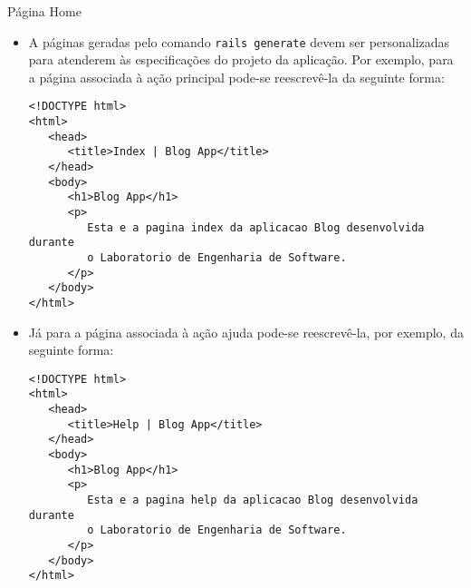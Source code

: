 
\begin{frame}{Página Home}
    \begin{itemize}
      \item  A páginas geradas pelo comando \verb!rails generate! devem ser personalizadas para
	atenderem às especificações do projeto da aplicação. Por exemplo, para a página associada à ação principal
	pode-se reescrevê-la da seguinte forma:
	    \begin{lstlisting}[style=RubyInputStyle, basicstyle=\tiny\ttfamily, caption=app/views/home/index.html.erb]
<!DOCTYPE html>
<html>
   <head>
      <title>Index | Blog App</title>
   </head>
   <body>
      <h1>Blog App</h1>
      <p>
         Esta e a pagina index da aplicacao Blog desenvolvida durante
         o Laboratorio de Engenharia de Software.
      </p>
   </body>
</html>
	    \end{lstlisting}
    
      \item Já para a página associada à ação ajuda pode-se reescrevê-la, por exemplo, da seguinte forma:
	    \begin{lstlisting}[style=RubyInputStyle, basicstyle=\tiny\ttfamily, caption=app/views/home/help.html.erb]
<!DOCTYPE html>
<html>
   <head>
      <title>Help | Blog App</title>
   </head>
   <body>
      <h1>Blog App</h1>
      <p>
         Esta e a pagina help da aplicacao Blog desenvolvida durante
         o Laboratorio de Engenharia de Software.
      </p>
   </body>
</html>
	    \end{lstlisting}
    \end{itemize}
    
\end{frame}